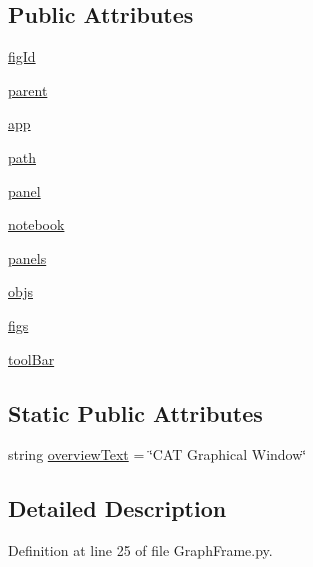 \subsection*{Public Attributes}
\begin{DoxyCompactItemize}
\item 
\hyperlink{classGraphFrame_1_1GraphFrame_a11acbdec2055acdd75e28b9d5e7f5d68}{figId}
\item 
\hyperlink{classGraphFrame_1_1GraphFrame_af4d6ec7c5827c044e824a382bbcf6d6b}{parent}
\item 
\hyperlink{classGraphFrame_1_1GraphFrame_ada0f65a1687cb280f0c806880018bab6}{app}
\item 
\hyperlink{classGraphFrame_1_1GraphFrame_ac980711b701a76e8fa25effaf24b8b6a}{path}
\item 
\hyperlink{classGraphFrame_1_1GraphFrame_a466fa275a58f14b3ad3ed7ab0f3e1556}{panel}
\item 
\hyperlink{classGraphFrame_1_1GraphFrame_a782a5936f03897f8c55fb5ff9acdded9}{notebook}
\item 
\hyperlink{classGraphFrame_1_1GraphFrame_a0e2de5fb8e5adda2912b5070b8389daa}{panels}
\item 
\hyperlink{classGraphFrame_1_1GraphFrame_a8e4ab824252d2f2078663d88f50f0dbb}{objs}
\item 
\hyperlink{classGraphFrame_1_1GraphFrame_aa3b3a37faec7ba92df01da7122467527}{figs}
\item 
\hyperlink{classGraphFrame_1_1GraphFrame_acbab8fe314e74a682d7c3603ae51c615}{toolBar}
\end{DoxyCompactItemize}
\subsection*{Static Public Attributes}
\begin{DoxyCompactItemize}
\item 
string \hyperlink{classGraphFrame_1_1GraphFrame_a0c76bd981289f7092b052d73a664184f}{overviewText} = \char`\"{}CAT Graphical Window\char`\"{}
\end{DoxyCompactItemize}


\subsection{Detailed Description}


Definition at line 25 of file GraphFrame.py.

